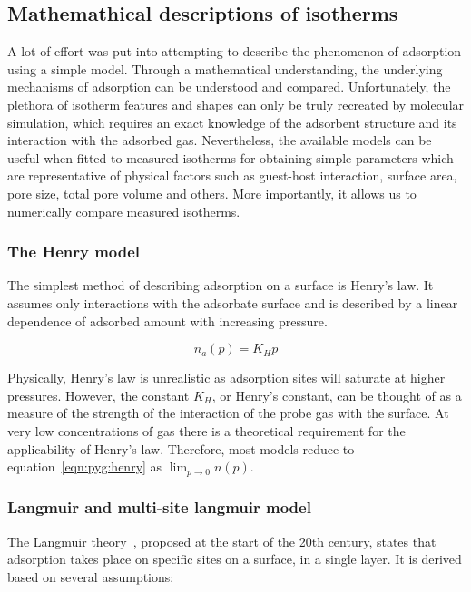 \subsection{Mathemathical descriptions of isotherms}

A lot of effort was put into attempting to describe 
the phenomenon of adsorption using a simple model.
Through a mathematical understanding, the underlying 
mechanisms of adsorption can be understood and 
compared.
Unfortunately, the plethora of isotherm 
features and shapes can only be truly recreated
by molecular simulation, which requires an exact
knowledge of the adsorbent structure and its interaction
with the adsorbed gas.
Nevertheless, the available models can be useful
when fitted to measured isotherms
for obtaining simple parameters which are 
representative of physical factors such as 
guest-host interaction, surface area, pore size,
total pore volume and others.
More importantly, it allows us to numerically 
compare measured isotherms. 


\subsubsection{The Henry model}

The simplest method of describing adsorption on a 
surface is Henry’s law. It assumes only interactions
with the adsorbate surface and is described by a 
linear dependence of adsorbed amount with
increasing pressure.

\begin{equation}\label{eqn:pyg:henry}
    n_a(p) = K_H p
\end{equation}

Physically, Henry's law is unrealistic as adsorption sites
will saturate at higher pressures. However, the constant \(K_H\),
or Henry’s constant, can be thought of as a measure of the strength
of the interaction of the probe gas with the surface. At very 
low concentrations of gas there is a 
theoretical requirement for the applicability of Henry's law.
Therefore, most models reduce to equation~\ref{eqn:pyg:henry}
as \(\lim_{p \to 0} n(p)\).

\subsubsection{Langmuir and multi-site langmuir model}

The Langmuir theory~\cite{langmuirAdsorptionGasesPlane1918a}, 
proposed at the start of the 20th century, states that
adsorption takes place on specific sites on a surface, in a single layer. 
It is derived based on several assumptions:

